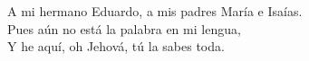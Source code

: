 \begin{dedication}
A mi hermano Eduardo, a mis padres María e Isaías.\\
Pues aún no está la palabra en mi lengua,\\
Y he aquí, oh Jehová, tú la sabes toda.
\end{dedication}
